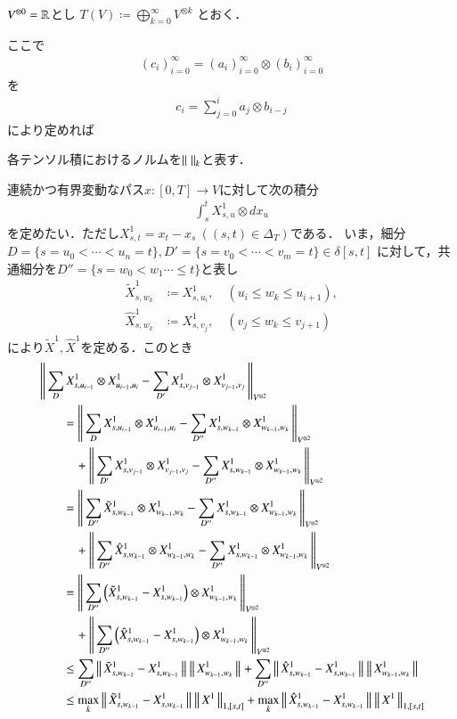 	$V^{\otimes 0} = \mathbb{R}$とし
	$T(V) \coloneqq \bigoplus_{k=0}^{\infty} V^{\otimes k}$
	とおく．
	
	ここで
	\begin{align}
		(c_i)_{i=0}^{\infty} = (a_i)_{i=0}^{\infty} \otimes (b_i)_{i=0}^{\infty}
	\end{align}
	を
	\begin{align}
		c_i = \sum_{j=0}^{i} a_{j} \otimes b_{i-j}
	\end{align}
	により定めれば
	
	各テンソル積におけるノルムを$\left\|\, \, \right\|_{k}$と表す．
	
	連続かつ有界変動なパス$x:[0,T] \longrightarrow V$に対して次の積分
	\begin{align}
		\int_s^t X^1_{s,u} \otimes d x_u
	\end{align}
	を定めたい．ただし$X^1_{s,t} = x_t - x_s\ ((s,t) \in \Delta_T)$である．
	いま，細分$D=\{s=u_0 < \cdots <u_n= t\},D'=\{s=v_0 < \cdots <v_m= t\} \in \delta[s,t]$
	に対して，共通細分を$D''=\{s=w_0 < w_1 \cdots \leq t\}$と表し
	\begin{align}
		\tilde{X}^1_{s,w_k} &\coloneqq X^1_{s,u_i},
		\quad (u_i \leq w_k \leq u_{i+1}), \\
		\hat{X}^1_{s,w_k} &\coloneqq X^1_{s,v_j},
		\quad (v_j \leq w_k \leq v_{j+1})
	\end{align}
	により$\tilde{X}^1,\hat{X}^1$を定める．このとき
	\begin{align}
		&\left\|\,  \sum_D X^1_{s,u_{i-1}} \otimes X^1_{u_{i-1},u_i} - 
			\sum_{D'} X^1_{s,v_{j-1}} \otimes X^1_{v_{j-1},v_j}\, \right\|_{V^{\otimes 2}} \\
		&\qquad= \left\|\,  \sum_D X^1_{s,u_{i-1}} \otimes X^1_{u_{i-1},u_i} - 
			\sum_{D''} X^1_{s,w_{k-1}} \otimes X^1_{w_{k-1},w_k}\, \right\|_{V^{\otimes 2}} \\
			&\quad\qquad + \left\|\,  \sum_{D'} X^1_{s,v_{j-1}} \otimes X^1_{v_{j-1},v_j} - 
			\sum_{D''} X^1_{s,w_{k-1}} \otimes X^1_{w_{k-1},w_k}\, \right\|_{V^{\otimes 2}} \\
		&\qquad= \left\|\,  \sum_{D''} \tilde{X}^1_{s,w_{k-1}} \otimes X^1_{w_{k-1},w_k} - 
			\sum_{D''} X^1_{s,w_{k-1}} \otimes X^1_{w_{k-1},w_k}\, \right\|_{V^{\otimes 2}} \\
			&\quad\qquad + \left\|\,  \sum_{D''} \hat{X}^1_{s,w_{k-1}} \otimes X^1_{w_{k-1},w_k} - 
			\sum_{D''} X^1_{s,w_{k-1}} \otimes X^1_{w_{k-1},w_k}\, \right\|_{V^{\otimes 2}} \\
		&\qquad= \left\|\,  \sum_{D''} \left(\tilde{X}^1_{s,w_{k-1}} -  X^1_{s,w_{k-1}} \right)
		 	\otimes X^1_{w_{k-1},w_k}\, \right\|_{V^{\otimes 2}} \\
			&\quad\qquad + \left\|\,  \sum_{D''} \left( \hat{X}^1_{s,w_{k-1}} - X^1_{s,w_{k-1}} \right)
			 \otimes X^1_{w_{k-1},w_k}\, \right\|_{V^{\otimes 2}} \\
		&\qquad \leq \sum_{D''} \left\|\, \tilde{X}^1_{s,w_{k-1}} -  X^1_{s,w_{k-1}}\, \right\|_{} \left\|\, X^1_{w_{k-1},w_k}\, \right\|_{}
			+ \sum_{D''} \left\|\, \hat{X}^1_{s,w_{k-1}} -  X^1_{s,w_{k-1}}\, \right\|_{} \left\|\, X^1_{w_{k-1},w_k}\, \right\|_{} \\
		&\qquad \leq \operatorname*{max}_{k} \left\|\, \tilde{X}^1_{s,w_{k-1}} -  X^1_{s,w_{k-1}}\, \right\|_{} 
			\left\|\, X^1\, \right\|_{1,[s,t]} + \operatorname*{max}_{k} \left\|\, \hat{X}^1_{s,w_{k-1}} -  X^1_{s,w_{k-1}}\, \right\|_{} 
			\left\|\, X^1\, \right\|_{1,[s,t]}
	\end{align}

